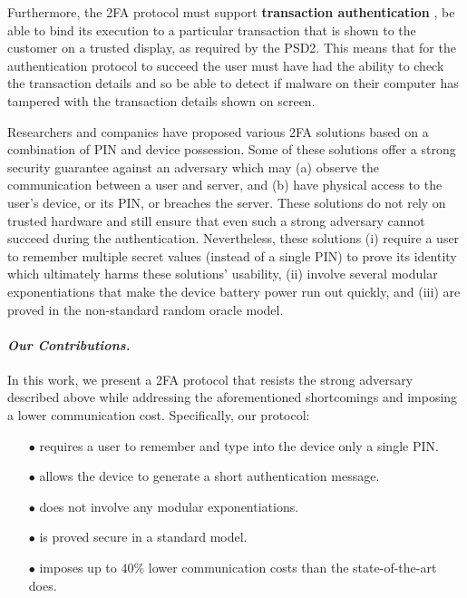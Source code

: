 Furthermore, the 2FA protocol must support \textbf{transaction authentication} \ie, be able to bind its execution to a particular transaction that is shown to the customer on a trusted display, as required by the PSD2.
This means that for the authentication protocol to succeed the user must have had the ability to check the transaction details and so be able to detect if malware on their computer has tampered with the transaction details shown on screen.

Researchers and companies have proposed various 2FA solutions based on a combination of PIN and device possession. Some of these solutions offer a strong security guarantee against an adversary which may (a) observe the communication between a user and server, and (b) have physical access to the user's device, or its PIN, or breaches the server. These solutions do not rely on trusted hardware and still ensure that even such a strong adversary cannot succeed during the authentication. Nevertheless, these solutions (i) require a user to remember multiple secret values (instead of a single PIN)  to prove its identity which ultimately harms these solutions' usability, (ii) involve several modular exponentiations that make the device battery power run out quickly, and (iii) are proved in the non-standard random oracle model.

\paragraph{\textbf{\textit{Our Contributions.}}}  In this work, we present a 2FA protocol that resists the strong adversary described above while addressing the aforementioned shortcomings and imposing a lower communication cost. Specifically, our protocol:

\begin{itemize}
\item[$\bullet$] requires a user to remember and type into the device only a single PIN.

\item[$\bullet$] {allows the device to generate a short authentication message.} 

\item[$\bullet$] does not involve any modular exponentiations.

\item[$\bullet$] is proved secure in a standard model.

\item[$\bullet$]  imposes up to $40\%$ lower communication costs than the state-of-the-art does. 


\end{itemize}

